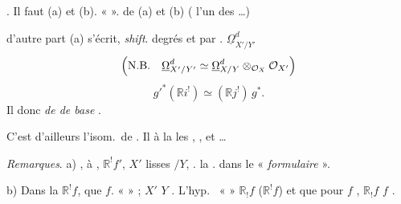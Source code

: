 \documentclass[11pt,a4paper]{article}
\begin{document}
 \ill{} \ill{} \ill{} . Il faut
\ill{} (a) et (b).  \ill{} \ill{} \ill{} \ill{} \ill{}
 « \ill{}  ».
\ill{} \ill{} \ill{} de  (a) et (b) \ill{} \ill{}
 \ill{} \ill{} \ill{} \ill{} \ill{}
( l'un des \ill{} \ill{} \struck{\ill{}} \ill{} \ill{}
\ill{} \ill{} …)

d'autre part (a) s'écrit, \ill{} \ill{} \emph{shift}.
\ill{} degrés et  par \struck{\ill{}}.
\ill{} $\underline{\Omega}^d_{X'/Y'}$
\[
  \Bigl(\text{N.B.}\quad \underline{\Omega}^d_{X'/Y'} \simeq \underline{\Omega}^d_{X/Y} \otimes_{\mathcal{O}_X} \mathcal{O}_{X'}\Bigr)
\]
\[
  g'^*(\mathbb{R}i^!) \simeq (\mathbb{R}j^!)\, g^* .
\]
Il  donc \ill{} \ill{}  \emph{ de
 de base }.

C'est d'ailleurs l'isom.\ de  \ill{}
  \ill{} . Il
\ill{} à  la  \ill{} les
 \ill{} , \ill{} \ill{} \ill{} \ill{}
, et \ill{}  \ill{} \ill{} …

\emph{Remarques}. a)  \ill{} \ill{} \ill{} \ill{}, à
\ill{} \ill{} \ill{}, \ill{}  \ill{} 
\ill{} \ill{} \ill{} \ill{}  $\mathbb{R}^! f'$, \ill{}
\ill{} \ill{} \ill{} $X'$ lisses $/Y$, \ill{} \ill{} \ill{} \ill{} \ill{}
 \ill{} \ill{}. \ill{} la 
\ill{} \ill{} \ill{} . \ill{} \ill{}
 \ill{} \ill{} \ill{}  dans le
« \emph{formulaire} ».

b) Dans la  \ill{} 
$\mathbb{R}^! f$, \ill{} \ill{} \ill{}  \ill{} \ill{}
que $f$. \ill{} \ill{}  \ill{} «  » ; \struck{\ill{}} \ill{} \ill{} $X'$   \ill{}
\ill{}  \ill{} $Y$ \ill{}. L'hyp.\ \ill{} \ill{}
«  » \ill{} \ill{} \ill{} \ill{}
\ill{} \ill{} \ill{} \ill{} $\mathbb{R}_!f$ ($\mathbb{R}^!f$) et \ill{} que
\struck{\ill{} \ill{}} \ill{} \ill{} \ill{} \ill{} \ill{} \ill{}
 \ill{} pour $f$ 
\ill{} , \ill{} \ill{}  \ill{}
$\mathbb{R}_! f$ \ill{} \ill{} \ill{} $f$ \ill{} \ill{} \ill{} \ill{}
 \ill{} \ill{} \ill{}.
\end{document}
